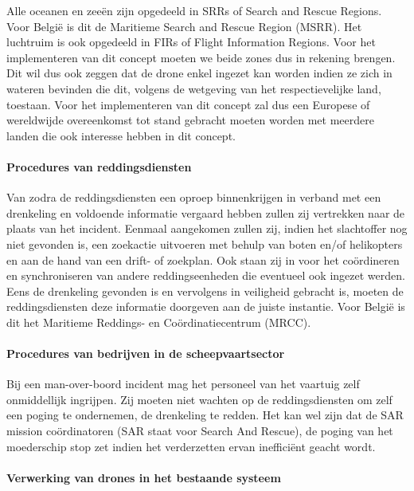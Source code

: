 Alle oceanen en zeeën zijn opgedeeld in SRRs of Search and Rescue Regions. Voor België is dit de Maritieme Search and Rescue Region (MSRR). Het luchtruim is ook opgedeeld in FIRs of Flight Information Regions. Voor het implementeren van dit concept moeten we beide zones dus in rekening brengen. Dit wil dus ook zeggen dat de drone enkel ingezet kan worden indien ze zich in wateren bevinden die dit, volgens de wetgeving van het respectievelijke land, toestaan. Voor het implementeren van dit concept zal dus een Europese of wereldwijde overeenkomst tot stand gebracht moeten worden met meerdere landen die ook interesse hebben in dit concept.   

\paragraph{Procedures van reddingsdiensten}

Van zodra de reddingsdiensten een oproep binnenkrijgen in verband met een drenkeling en voldoende informatie vergaard hebben zullen zij vertrekken naar de plaats van het incident. Eenmaal aangekomen zullen zij, indien het slachtoffer nog niet gevonden is, een zoekactie uitvoeren met behulp van boten en/of helikopters en aan de hand van een drift- of zoekplan. Ook staan zij in voor het coördineren en synchroniseren van andere reddingseenheden die eventueel ook ingezet werden. Eens de drenkeling gevonden is en vervolgens in veiligheid gebracht is, moeten de reddingsdiensten deze informatie doorgeven aan de juiste instantie. Voor België is dit het Maritieme Reddings- en Coördinatiecentrum (MRCC). 

\paragraph{Procedures van bedrijven in de scheepvaartsector}

Bij een man-over-boord incident mag het personeel van het vaartuig zelf onmiddellijk ingrijpen. Zij moeten niet wachten op de reddingsdiensten om zelf een poging te ondernemen, de drenkeling te redden. Het kan wel zijn dat de SAR mission coördinatoren (SAR staat voor Search And Rescue), de poging van het moederschip stop zet indien het verderzetten ervan inefficiënt geacht wordt.

\paragraph{Verwerking van drones in het bestaande systeem}

